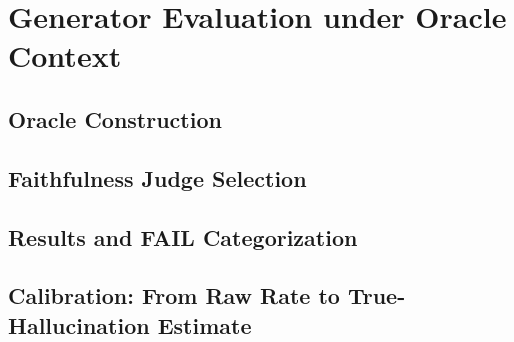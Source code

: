 \section{Generator Evaluation under Oracle Context}
\label{sec:generator}


\subsection{Oracle Construction}

\subsection{Faithfulness Judge Selection}

\subsection{Results and FAIL Categorization}

\subsection{Calibration: From Raw Rate to True-Hallucination Estimate}

